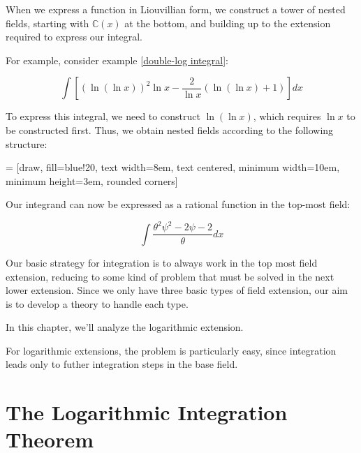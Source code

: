 

When we express a function in Liouvillian form, we construct
a tower of nested fields, starting with ${\mathbb C}(x)$
at the bottom, and building up to the extension required
to express our integral.

For example, consider example \ref{double-log integral}:

$$\int \left[ (\ln(\ln x))^2 \ln x - \frac{2}{\ln x}(\ln(\ln x) +1) \right] dx$$

To express this integral, we need to construct $\ln (\ln x)$, which
requires $\ln x$ to be constructed first.  Thus, we obtain nested
fields according to the following structure:

 = [draw, fill=blue!20, text width=8em, text centered,
  minimum width=10em, minimum height=3em, rounded corners]

\begin{center}
\end{center}

Our integrand can now be expressed as a rational function in the
top-most field:

$$\int \frac{\theta^2 \psi^2 - 2 \psi - 2}{\theta} dx$$

Our basic strategy for integration is to always work in the top most
field extension, reducing to some kind of problem that must be solved
in the next lower extension.  Since we only have three basic types of
field extension, our aim is to develop a theory to handle each type.

In this chapter, we'll analyze the logarithmic extension.

For logarithmic extensions, the problem is particularly easy,
since integration leads only to futher integration steps
in the base field.

\vfill\eject
\section{The Logarithmic Integration Theorem}

